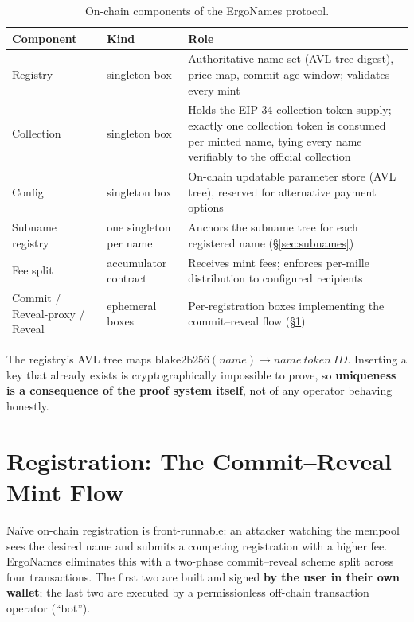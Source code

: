 \documentclass[11pt]{article}
\begin{document}
\begin{table}[ht]
  \centering
  \small
  \begin{tabularx}{\textwidth}{@{}l l X@{}}
    \toprule
    \textbf{Component} & \textbf{Kind} & \textbf{Role} \\
    \midrule
    Registry & singleton box & Authoritative name set (AVL tree digest),
      price map, commit-age window; validates every mint \\
    \addlinespace
    Collection & singleton box & Holds the EIP-34 collection token supply;
      exactly one collection token is consumed per minted name, tying every
      name verifiably to the official collection \\
    \addlinespace
    Config & singleton box & On-chain updatable parameter store (AVL tree),
      reserved for alternative payment options \\
    \addlinespace
    Subname registry & one singleton per name & Anchors the subname tree for
      each registered name (\S\ref{sec:subnames}) \\
    \addlinespace
    Fee split & accumulator contract & Receives mint fees; enforces per-mille
      distribution to configured recipients \\
    \addlinespace
    Commit / Reveal-proxy / Reveal & ephemeral boxes & Per-registration boxes
      implementing the commit--reveal flow (\S\ref{sec:mintflow}) \\
    \bottomrule
  \end{tabularx}
  \caption{On-chain components of the ErgoNames protocol.}
  \label{tab:components}
\end{table}

The registry's AVL tree maps $\mathrm{blake2b256}(\mathit{name}) \rightarrow
\mathit{name\ token\ ID}$. Inserting a key that already exists is
cryptographically impossible to prove, so \textbf{uniqueness is a consequence
of the proof system itself}, not of any operator behaving honestly.

\section{Registration: The Commit--Reveal Mint Flow}
\label{sec:mintflow}

Na\"ive on-chain registration is front-runnable: an attacker watching the
mempool sees the desired name and submits a competing registration with a
higher fee. ErgoNames eliminates this with a two-phase commit--reveal scheme
split across four transactions. The first two are built and signed
\textbf{by the user in their own wallet}; the last two are executed by a
permissionless off-chain transaction operator (``bot'').
\end{document}
